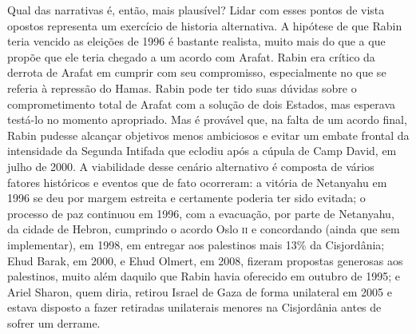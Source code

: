 Qual das narrativas é, então, mais plausível? Lidar com esses pontos de
vista opostos representa um exercício de historia alternativa. A
hipótese de que Rabin teria vencido as eleições de 1996 é bastante
realista, muito mais do que a que propõe que ele teria chegado a um acordo
com Arafat. Rabin era crítico da derrota de Arafat em cumprir com seu
compromisso, especialmente no que se referia à repressão do Hamas.
Rabin pode ter tido suas dúvidas sobre o comprometimento total de Arafat
com a solução de dois Estados, mas esperava testá-lo no momento
apropriado. Mas é provável que, na falta de um acordo final, Rabin
pudesse alcançar objetivos menos ambiciosos e evitar um embate frontal da
intensidade da Segunda Intifada que eclodiu após a cúpula de Camp David,
em julho de 2000. A viabilidade desse cenário alternativo é composta de
vários fatores históricos e eventos que de fato ocorreram: a vitória de
Netanyahu em 1996 se deu por margem estreita e certamente poderia ter sido
evitada; o processo de paz continuou em 1996, com a evacuação, por parte
de Netanyahu, da cidade de Hebron, cumprindo o acordo Oslo \textsc{ii} e
concordando (ainda que sem implementar), em 1998, em entregar aos palestinos
mais 13\% da Cisjordânia; Ehud Barak, em 2000, e Ehud Olmert, em 2008,
fizeram propostas generosas aos palestinos, muito além daquilo que Rabin
havia oferecido em outubro de 1995; e Ariel Sharon, quem diria, retirou
Israel de Gaza de forma unilateral em 2005 e estava disposto a fazer
retiradas unilaterais menores na Cisjordânia antes de sofrer um derrame.


